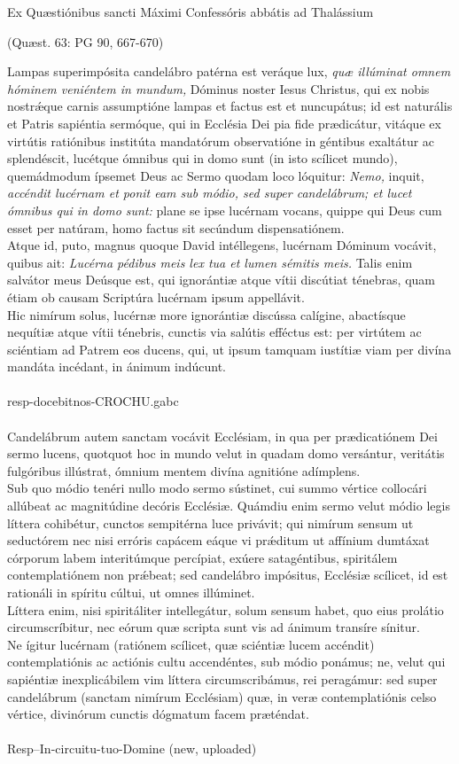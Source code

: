 \documentclass[options]{article}
\begin{document}
	Ex Quæstiónibus sancti Máximi Confessóris abbátis ad Thalássium
	\begin{flushright}
		(Quæst. 63: PG 90, 667-670)
	\end{flushright}
Lampas superimpósita candelábro patérna est veráque lux, 
\emph{quæ illúminat omnem hóminem veniéntem in mundum,}
Dóminus noster Iesus Christus, qui ex nobis nostr\'{æ}que carnis assumptióne lampas et factus est et nuncupátus; id est naturális et Patris sapiéntia sermóque, qui in Ecclésia Dei pia fide prædicátur, vitáque ex virtútis ratiónibus institúta mandatórum observatióne in géntibus exaltátur ac splendéscit, lucétque ómnibus qui in domo sunt (in isto scílicet mundo), quemádmodum ípsemet Deus ac Sermo quodam loco lóquitur: 
\emph{Nemo,}
inquit,
\emph{accéndit lucérnam et ponit eam sub módio, sed super candelábrum; et lucet ómnibus qui in domo sunt:}
plane se ipse lucérnam vocans, quippe qui Deus cum esset per natúram, homo factus sit secúndum dispensatiónem.\\
Atque id, puto, magnus quoque David intéllegens, lucérnam Dóminum vocávit, quibus ait:
\emph{Lucérna pédibus meis lex tua et lumen sémitis meis.}
Talis enim salvátor meus Deúsque est, qui ignorántiæ atque vítii discútiat ténebras, quam étiam ob causam Scriptúra lucérnam ipsum appellávit.\\
Hic nimírum solus, lucérnæ more ignorántiæ discússa calígine, abactísque nequítiæ atque vítii ténebris, cunctis via salútis efféctus est: per virtútem ac sciéntiam ad Patrem eos ducens, qui, ut ipsum tamquam iustítiæ viam per divína mandáta incédant, in ánimum indúcunt. \\
\\
resp-docebitnos-CROCHU.gabc\\
\\
 Candelábrum autem sanctam vocávit Ecclésiam, in qua per prædicatiónem Dei sermo lucens, quotquot hoc in mundo velut in quadam domo versántur, veritátis fulgóribus illústrat, ómnium mentem divína agnitióne adímplens.\\
  Sub quo módio tenéri nullo modo sermo sústinet, cui summo vértice collocári allúbeat ac magnitúdine decóris Ecclésiæ. Quámdiu enim sermo velut módio legis líttera cohibétur, cunctos sempitérna luce privávit; qui nimírum sensum ut seductórem nec nisi erróris capácem eáque vi pr\'{æ}ditum ut affínium dumtáxat córporum labem interitúmque percípiat, exúere satagéntibus, spiritálem contemplatiónem non pr\'{æ}beat; sed candelábro impósitus, Ecclésiæ scílicet, id est rationáli in spíritu cúltui, ut omnes illúminet.\\
   Líttera enim, nisi spiritáliter intellegátur, solum sensum habet, quo eius prolátio circumscríbitur, nec eórum quæ scripta sunt vis ad ánimum transíre sínitur.\\
    Ne ígitur lucérnam (ratiónem scílicet, quæ sciéntiæ lucem accéndit) contemplatiónis ac actiónis cultu accendéntes, sub módio ponámus; ne, velut qui sapiéntiæ inexplicábilem vim líttera circumscribámus, rei peragámur: sed super candelábrum (sanctam nimírum Ecclésiam) quæ, in veræ contemplatiónis celso vértice, divinórum cunctis dógmatum facem præténdat.\\
    \\
    
   
   Resp--In-circuitu-tuo-Domine (new, uploaded)
  
\end{document}
